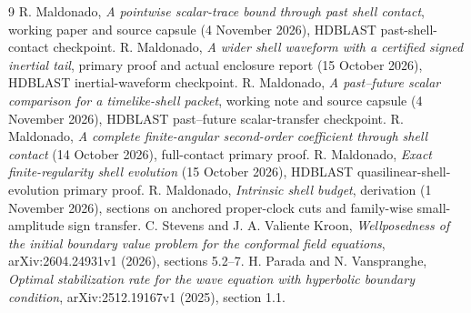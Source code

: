 \documentclass[11pt]{article}
\begin{document}
\begin{thebibliography}{9}\small
{} R. Maldonado, \emph{A pointwise scalar-trace bound through past
shell contact}, working paper and source capsule (4 November 2026),
HDBLAST past-shell-contact checkpoint.
 R. Maldonado, \emph{A wider shell waveform with a certified
signed inertial tail}, primary proof and actual enclosure report
(15 October 2026), HDBLAST inertial-waveform checkpoint.
 R. Maldonado, \emph{A past--future scalar comparison for a
timelike-shell packet}, working note and source capsule (4 November 2026),
HDBLAST past--future scalar-transfer checkpoint.
 R. Maldonado, \emph{A complete finite-angular second-order
coefficient through shell contact} (14 October 2026), full-contact primary proof.
 R. Maldonado, \emph{Exact finite-regularity shell evolution}
(15 October 2026), HDBLAST quasilinear-shell-evolution primary proof.
 R. Maldonado, \emph{Intrinsic shell budget}, derivation
(1 November 2026), sections on anchored proper-clock cuts and family-wise
small-amplitude sign transfer.
 C. Stevens and J. A. Valiente Kroon,
\emph{Wellposedness of the initial boundary value problem for the conformal
field equations}, arXiv:2604.24931v1 (2026), sections 5.2--7.
 H. Parada and N. Vanspranghe,
\emph{Optimal stabilization rate for the wave equation with hyperbolic boundary
condition}, arXiv:2512.19167v1 (2025), section 1.1.
\end{thebibliography}
\end{document}
